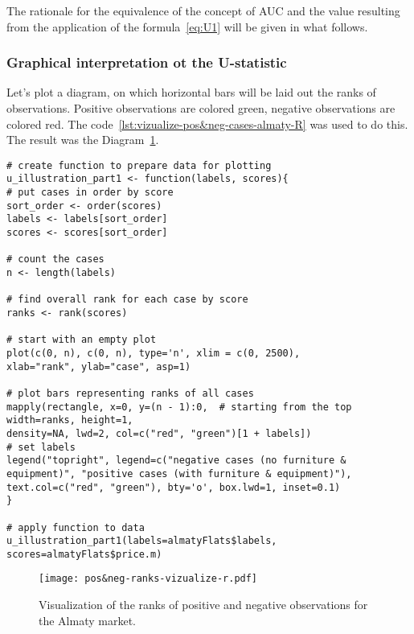 \documentclass[]{scrreprt}
\begin{document}
The rationale for the equivalence of the concept of AUC and the value resulting from the application of the formula~\ref{eq:U1} will be given in what follows.
%
\subsubsection{Graphical interpretation ot the U-statistic}
Let's plot a diagram, on which horizontal bars will be laid out the ranks of observations. Positive observations are colored green, negative observations are colored red. The code~\ref{lst:vizualize-pos&neg-cases-almaty-R} was used to do this. The result was the Diagram~\ref{fig:pos&neg-ranks-vizualize-r.pdf}.
%
\begin{lstlisting}[float=htp, caption = Visualization of the ranks of positive and negative observations for the Almaty market, firstnumber=1, label= lst:vizualize-pos&neg-cases-almaty-R]
# create function to prepare data for plotting
u_illustration_part1 <- function(labels, scores){
# put cases in order by score
sort_order <- order(scores)
labels <- labels[sort_order]
scores <- scores[sort_order]

# count the cases
n <- length(labels)

# find overall rank for each case by score
ranks <- rank(scores)

# start with an empty plot
plot(c(0, n), c(0, n), type='n', xlim = c(0, 2500),
xlab="rank", ylab="case", asp=1)

# plot bars representing ranks of all cases
mapply(rectangle, x=0, y=(n - 1):0,  # starting from the top 
width=ranks, height=1, 
density=NA, lwd=2, col=c("red", "green")[1 + labels])
# set labels   
legend("topright", legend=c("negative cases (no furniture & equipment)", "positive cases (with furniture & equipment)"), 
text.col=c("red", "green"), bty='o', box.lwd=1, inset=0.1)
}

# apply function to data
u_illustration_part1(labels=almatyFlats$labels, scores=almatyFlats$price.m)
\end{lstlisting}
%
\begin{figure}[htp]
	\centering
	\texttt{[image: pos\&neg-ranks-vizualize-r.pdf]}
	\caption{Visualization of the ranks of positive and negative observations for the Almaty market.}
	\label{fig:pos&neg-ranks-vizualize-r.pdf}
\end{figure}
%
\end{document}
